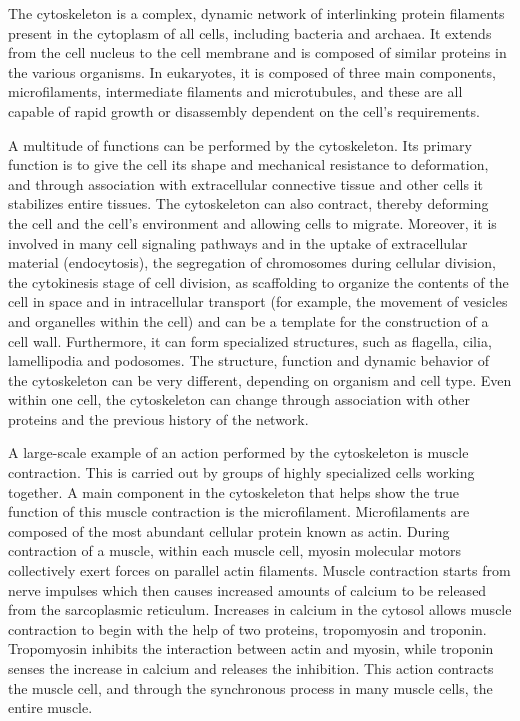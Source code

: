 The cytoskeleton is a complex, dynamic network of interlinking protein filaments present in the cytoplasm of all cells, including bacteria and archaea. It extends from the cell nucleus to the cell membrane and is composed of similar proteins in the various organisms. In eukaryotes, it is composed of three main components, microfilaments, intermediate filaments and microtubules, and these are all capable of rapid growth or disassembly dependent on the cell's requirements.

A multitude of functions can be performed by the cytoskeleton. Its primary function is to give the cell its shape and mechanical resistance to deformation, and through association with extracellular connective tissue and other cells it stabilizes entire tissues. The cytoskeleton can also contract, thereby deforming the cell and the cell's environment and allowing cells to migrate. Moreover, it is involved in many cell signaling pathways and in the uptake of extracellular material (endocytosis), the segregation of chromosomes during cellular division, the cytokinesis stage of cell division, as scaffolding to organize the contents of the cell in space and in intracellular transport (for example, the movement of vesicles and organelles within the cell) and can be a template for the construction of a cell wall. Furthermore, it can form specialized structures, such as flagella, cilia, lamellipodia and podosomes. The structure, function and dynamic behavior of the cytoskeleton can be very different, depending on organism and cell type. Even within one cell, the cytoskeleton can change through association with other proteins and the previous history of the network.

A large-scale example of an action performed by the cytoskeleton is muscle contraction. This is carried out by groups of highly specialized cells working together. A main component in the cytoskeleton that helps show the true function of this muscle contraction is the microfilament. Microfilaments are composed of the most abundant cellular protein known as actin. During contraction of a muscle, within each muscle cell, myosin molecular motors collectively exert forces on parallel actin filaments. Muscle contraction starts from nerve impulses which then causes increased amounts of calcium to be released from the sarcoplasmic reticulum. Increases in calcium in the cytosol allows muscle contraction to begin with the help of two proteins, tropomyosin and troponin. Tropomyosin inhibits the interaction between actin and myosin, while troponin senses the increase in calcium and releases the inhibition. This action contracts the muscle cell, and through the synchronous process in many muscle cells, the entire muscle.

